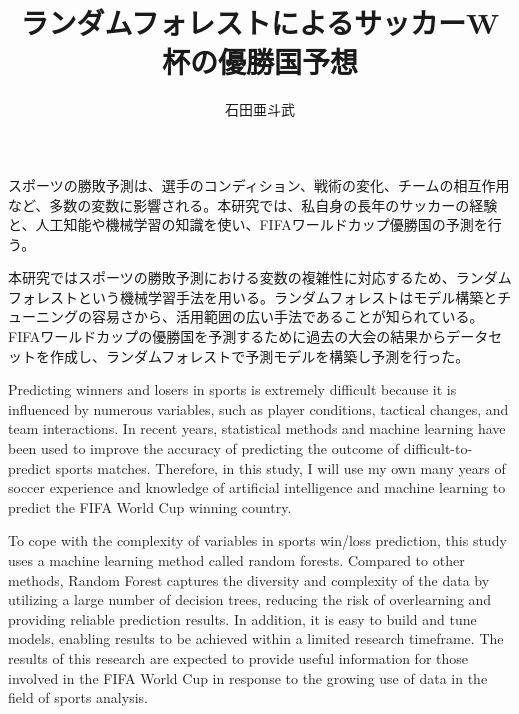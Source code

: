\documentclass[platex]{suribt}
\title{ランダムフォレストによるサッカーW杯の優勝国予想}
\author{石田亜斗武}
\begin{document}
\maketitle%


\frontmatter%
\begin{jabstract}%
  スポーツの勝敗予測は、選手のコンディション、戦術の変化、チームの相互作用など、多数の変数に影響される。本研究では、私自身の長年のサッカーの経験と、人工知能や機械学習の知識を使い、FIFAワールドカップ優勝国の予測を行う。\par
  本研究ではスポーツの勝敗予測における変数の複雑性に対応するため、ランダムフォレストという機械学習手法を用いる。ランダムフォレストはモデル構築とチューニングの容易さから、活用範囲の広い手法であることが知られている。FIFAワールドカップの優勝国を予測するために過去の大会の結果からデータセットを作成し、ランダムフォレストで予測モデルを構築し予測を行った。

\end{jabstract}

\newpage


\begin{eabstract}%
  Predicting winners and losers in sports is extremely difficult because it is influenced by numerous variables, such as player conditions, tactical changes, and team interactions. In recent years, statistical methods and machine learning have been used to improve the accuracy of predicting the outcome of difficult-to-predict sports matches. Therefore, in this study, I will use my own many years of soccer experience and knowledge of artificial intelligence and machine learning to predict the FIFA World Cup winning country.\par
  To cope with the complexity of variables in sports win/loss prediction, this study uses a machine learning method called random forests. Compared to other methods, Random Forest captures the diversity and complexity of the data by utilizing a large number of decision trees, reducing the risk of overlearning and providing reliable prediction results. In addition, it is easy to build and tune models, enabling results to be achieved within a limited research timeframe. The results of this research are expected to provide useful information for those involved in the FIFA World Cup in response to the growing use of data in the field of sports analysis. 
\end{eabstract}

\setcounter{tocdepth}{2}
\tableofcontents%
\mainmatter%
\end{document}
